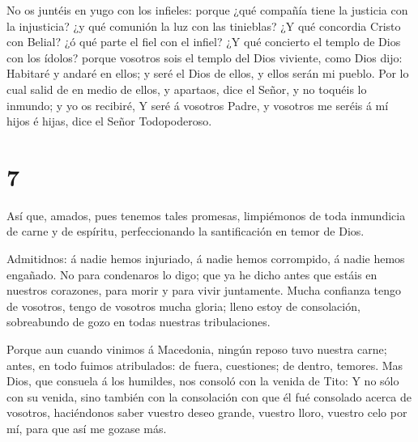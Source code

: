  No os juntéis en yugo con los infieles: porque ¿qué
compañía tiene la justicia con la injusticia? ¿y qué comunión la luz con
las tinieblas?  ¿Y qué concordia Cristo con Belial? ¿ó qué
parte el fiel con el infiel?  ¿Y qué concierto el templo de
Dios con los ídolos? porque vosotros sois el templo del Dios viviente,
como Dios dijo: Habitaré y andaré en ellos; y seré el Dios de ellos, y
ellos serán mi pueblo.  Por lo cual salid de en medio de
ellos, y apartaos, dice el Señor, y no toquéis lo inmundo; y yo os
recibiré,  Y seré á vosotros Padre, y vosotros me seréis á
mí hijos é hijas, dice el Señor Todopoderoso.

\hypertarget{section-6}{%
\section{7}\label{section-6}}

 Así que, amados, pues tenemos tales promesas, limpiémonos
de toda inmundicia de carne y de espíritu, perfeccionando la
santificación en temor de Dios.

 Admitidnos: á nadie hemos injuriado, á nadie hemos
corrompido, á nadie hemos engañado.  No para condenaros lo
digo; que ya he dicho antes que estáis en nuestros corazones, para morir
y para vivir juntamente.  Mucha confianza tengo de vosotros,
tengo de vosotros mucha gloria; lleno estoy de consolación, sobreabundo
de gozo en todas nuestras tribulaciones.

 Porque aun cuando vinimos á Macedonia, ningún reposo tuvo
nuestra carne; antes, en todo fuimos atribulados: de fuera, cuestiones;
de dentro, temores.  Mas Dios, que consuela á los humildes,
nos consoló con la venida de Tito:  Y no sólo con su venida,
sino también con la consolación con que él fué consolado acerca de
vosotros, haciéndonos saber vuestro deseo grande, vuestro lloro, vuestro
celo por mí, para que así me gozase más.

